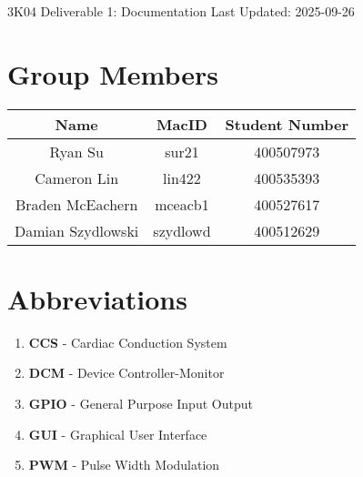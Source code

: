 \documentclass{article}
\begin{document}

\begin{titlepage}
    \begin{center}
        \vspace*{1cm}
        \Huge
        3K04 Deliverable 1: Documentation
        \normalsize
        \vfill
        Last Updated: 2025-09-26
    \end{center}
 \end{titlepage}


\newpage
\tableofcontents


\newpage
{}
\listoffigures
{}

\listoftables
{}


\newpage
\section{Group Members}
\begin{tabular}{|c|c|c|}
    \hline
    Name        & MacID         & Student Number    \\
    \hline
    Ryan Su     & sur21         & 400507973         \\
    \hline
    Cameron Lin & lin422        & 400535393         \\
    \hline
    Braden McEachern & mceacb1  & 400527617 \\
    \hline
    Damian Szydlowski & szydlowd & 400512629 \\
    \hline
\end{tabular}

\newpage
\section{Abbreviations}
\begin{enumerate}[label=]
    \item \textbf{CCS} - Cardiac Conduction System
    \item \textbf{DCM} - Device Controller-Monitor
    \item \textbf{GPIO} - General Purpose Input Output
    \item \textbf{GUI} - Graphical User Interface
    \item \textbf{PWM} - Pulse Width Modulation
\end{enumerate}
\end{document}
